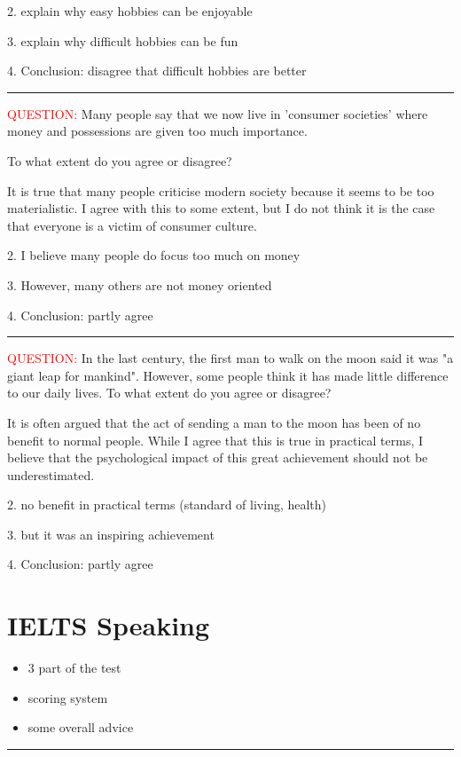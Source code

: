 \documentclass[12pt,a4paper]{article}
\newcommand{\textred}[1]{\textcolor{red}{#1}}  %
\begin{document}
2. explain why easy hobbies can be enjoyable  

3. explain why difficult hobbies can be fun  

4. Conclusion: disagree that difficult hobbies are better





\rule{\linewidth}{0.4pt}

\textred{QUESTION:}
Many people say that we now live in 'consumer societies' where money and possessions are given too much importance.

To what extent do you agree or disagree?

It is true that many people criticise modern society because it seems to be too materialistic. 
I agree with this to some extent, 
but I do not think it is the case that everyone is a victim of consumer culture.

2. I believe many people do focus too much on money

3. However, many others are not money oriented

4. Conclusion: partly agree




\rule{\linewidth}{0.4pt}

\textred{QUESTION:}
In the last century, the first man to walk on the moon said it was "a giant leap for mankind". 
However, some people think it has made little difference to our daily lives. 
To what extent do you agree or disagree?

It is often argued that the act of sending a man to the moon has been of no benefit to normal people. While I agree that this is true in practical terms, I believe that the psychological impact of this great achievement should not be underestimated.

2. no benefit in practical terms (standard of living, health)

3. but it was an inspiring achievement

4. Conclusion: partly agree





\newpage
\section*{IELTS Speaking}

\begin{itemize}
    \item 3 part of the test
    \item scoring system
    \item some overall advice 
\end{itemize}
\rule{\linewidth}{1pt}
\end{document}
